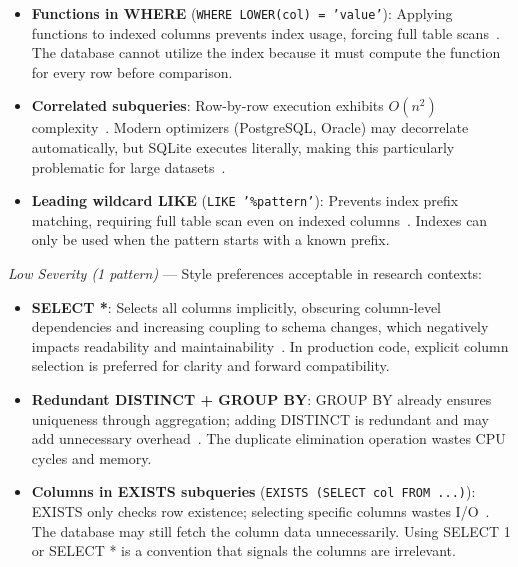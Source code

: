 \documentclass[]{einformatica}
\begin{document}
\begin{itemize}
\item \textbf{Functions in WHERE} (\texttt{WHERE LOWER(col) = 'value'}): Applying functions to indexed columns prevents index usage, forcing full table scans~\cite{karwin2010sqlantipatterns,molinaro2020sqlcookbook,ramakrishnan2003dbms}. The database cannot utilize the index because it must compute the function for every row before comparison.

\item \textbf{Correlated subqueries}: Row-by-row execution exhibits $O(n^2)$ complexity~\cite{karwin2010sqlantipatterns,molinaro2020sqlcookbook,ramakrishnan2003dbms}. Modern optimizers (PostgreSQL, Oracle) may decorrelate automatically, but SQLite executes literally, making this particularly problematic for large datasets~\cite{sqliteBareColumns}.

\item \textbf{Leading wildcard LIKE} (\texttt{LIKE '\%pattern'}): Prevents index prefix matching, requiring full table scan even on indexed columns~\cite{karwin2010sqlantipatterns,molinaro2020sqlcookbook,ramakrishnan2003dbms}. Indexes can only be used when the pattern starts with a known prefix.
\end{itemize}

\textit{Low Severity (1 pattern)} --- Style preferences acceptable in research contexts:

\begin{itemize}
\item \textbf{SELECT *}: Selects all columns implicitly, obscuring column-level dependencies and increasing coupling to schema changes, which negatively impacts readability and maintainability~\cite{karwin2010sqlantipatterns,molinaro2020sqlcookbook}. In production code, explicit column selection is preferred for clarity and forward compatibility.

\item \textbf{Redundant DISTINCT + GROUP BY}: GROUP BY already ensures uniqueness through aggregation; adding DISTINCT is redundant and may add unnecessary overhead~\cite{karwin2010sqlantipatterns,molinaro2020sqlcookbook}. The duplicate elimination operation wastes CPU cycles and memory.

\item \textbf{Columns in EXISTS subqueries} (\texttt{EXISTS (SELECT col FROM ...)}): EXISTS only checks row existence; selecting specific columns wastes I/O~\cite{karwin2010sqlantipatterns,molinaro2020sqlcookbook}. The database may still fetch the column data unnecessarily. Using SELECT 1 or SELECT * is a convention that signals the columns are irrelevant.
\end{itemize}
\end{document}
